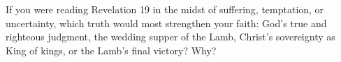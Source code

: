 \begin{ReaderQuestion}
If you were reading Revelation 19 in the midst of suffering, temptation, or uncertainty, which truth would most strengthen your faith: God's true and righteous judgment, the wedding supper of the Lamb, Christ's sovereignty as King of kings, or the Lamb's final victory? Why?
\end{ReaderQuestion}
